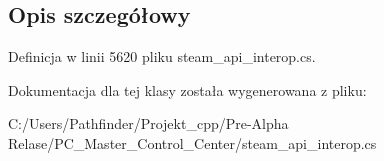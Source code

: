 \subsection{Opis szczegółowy}


Definicja w linii 5620 pliku steam\+\_\+api\+\_\+interop.\+cs.



Dokumentacja dla tej klasy została wygenerowana z pliku\+:\begin{DoxyCompactItemize}
\item 
C\+:/\+Users/\+Pathfinder/\+Projekt\+\_\+cpp/\+Pre-\/\+Alpha Relase/\+P\+C\+\_\+\+Master\+\_\+\+Control\+\_\+\+Center/steam\+\_\+api\+\_\+interop.\+cs\end{DoxyCompactItemize}
